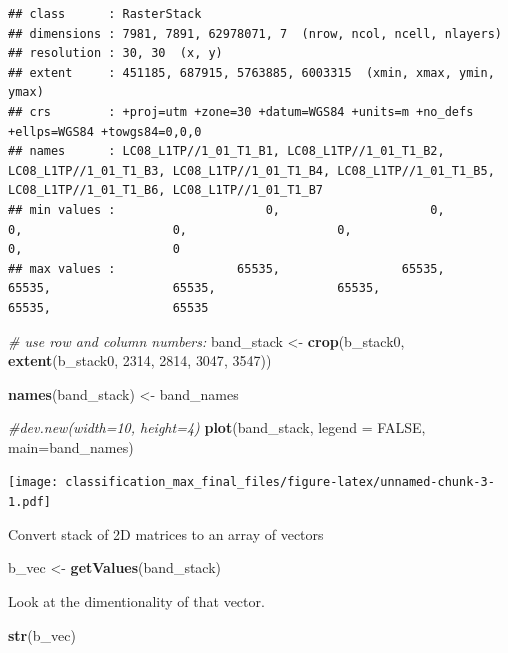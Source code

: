 \documentclass[]{article}
\newenvironment{Shaded}{\begin{snugshade}}{\end{snugshade}}
\newcommand{\CommentTok}[1]{\textcolor[rgb]{0.56,0.35,0.01}{\textit{#1}}}
\newcommand{\DataTypeTok}[1]{\textcolor[rgb]{0.13,0.29,0.53}{#1}}
\newcommand{\DecValTok}[1]{\textcolor[rgb]{0.00,0.00,0.81}{#1}}
\newcommand{\KeywordTok}[1]{\textcolor[rgb]{0.13,0.29,0.53}{\textbf{#1}}}
\newcommand{\NormalTok}[1]{#1}
\newcommand{\OtherTok}[1]{\textcolor[rgb]{0.56,0.35,0.01}{#1}}
\newcommand{\StringTok}[1]{\textcolor[rgb]{0.31,0.60,0.02}{#1}}
\begin{document}
\begin{verbatim}
## class      : RasterStack 
## dimensions : 7981, 7891, 62978071, 7  (nrow, ncol, ncell, nlayers)
## resolution : 30, 30  (x, y)
## extent     : 451185, 687915, 5763885, 6003315  (xmin, xmax, ymin, ymax)
## crs        : +proj=utm +zone=30 +datum=WGS84 +units=m +no_defs +ellps=WGS84 +towgs84=0,0,0 
## names      : LC08_L1TP//1_01_T1_B1, LC08_L1TP//1_01_T1_B2, LC08_L1TP//1_01_T1_B3, LC08_L1TP//1_01_T1_B4, LC08_L1TP//1_01_T1_B5, LC08_L1TP//1_01_T1_B6, LC08_L1TP//1_01_T1_B7 
## min values :                     0,                     0,                     0,                     0,                     0,                     0,                     0 
## max values :                 65535,                 65535,                 65535,                 65535,                 65535,                 65535,                 65535
\end{verbatim}

\begin{Shaded}
\begin{Highlighting}[]
\CommentTok{# use row and column numbers:}
\NormalTok{band_stack <-}\StringTok{ }\KeywordTok{crop}\NormalTok{(b_stack0, }\KeywordTok{extent}\NormalTok{(b_stack0, }\DecValTok{2314}\NormalTok{, }\DecValTok{2814}\NormalTok{, }\DecValTok{3047}\NormalTok{, }\DecValTok{3547}\NormalTok{))}

\KeywordTok{names}\NormalTok{(band_stack) <-}\StringTok{ }\NormalTok{band_names}

\CommentTok{#dev.new(width=10, height=4)}
\KeywordTok{plot}\NormalTok{(band_stack, }\DataTypeTok{legend =} \OtherTok{FALSE}\NormalTok{, }\DataTypeTok{main=}\NormalTok{band_names)}
\end{Highlighting}
\end{Shaded}

\texttt{[image: classification\_max\_final\_files/figure-latex/unnamed-chunk-3-1.pdf]}

Convert stack of 2D matrices to an array of vectors

\begin{Shaded}
\begin{Highlighting}[]
\NormalTok{b_vec <-}\StringTok{ }\KeywordTok{getValues}\NormalTok{(band_stack)}
\end{Highlighting}
\end{Shaded}

Look at the dimentionality of that vector.

\begin{Shaded}
\begin{Highlighting}[]
\KeywordTok{str}\NormalTok{(b_vec)}
\end{Highlighting}
\end{Shaded}
\end{document}
